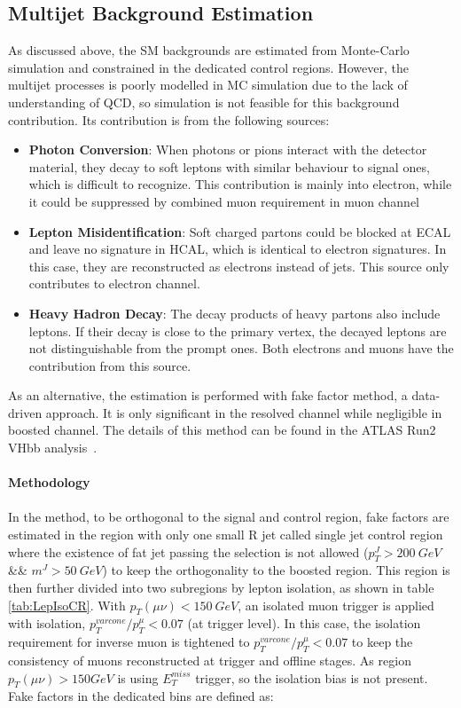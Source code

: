 \subsection{Multijet Background Estimation}
\label{sec:multijet_background}
As discussed above, the SM backgrounds are estimated from Monte-Carlo simulation and constrained in the dedicated control regions. However, the multijet processes is poorly modelled in MC simulation due to the lack of understanding of QCD, so simulation is not feasible for this background contribution. Its contribution is from the following sources:
\begin{itemize}
	\item {\bf Photon Conversion}: When photons or pions interact with the detector material, they decay to soft leptons with similar behaviour to signal ones, which is difficult to recognize. This contribution is mainly into electron, while it could be suppressed by combined muon requirement in muon channel
	\item {\bf Lepton Misidentification}: Soft charged partons could be blocked at ECAL and leave no signature in HCAL, which is identical to electron signatures. In this case, they are reconstructed as electrons instead of jets. This source only contributes to electron channel.
	\item {\bf Heavy Hadron Decay}: The decay products of heavy partons also include leptons. If their decay is close to the primary vertex, the decayed leptons are not distinguishable from the prompt ones. Both electrons and muons have the contribution from this source. 
\end{itemize}
\noindent
As an alternative, the estimation is performed with fake factor method, a data-driven approach. It is only significant in the resolved channel while negligible in boosted channel.  The details of this method can be found in the ATLAS Run2 VHbb analysis~\cite{ATLAS-CONF-2016-091, ATL-COM-PHYS-2016-429}. 
\\
\\{\bf Methodology}
\\
\\In the method, to be orthogonal to the signal and control region, fake factors are estimated in the region with only one small R jet called single jet control region where the existence of fat jet passing the selection is not allowed ($p_{T}^{J}>200~GeV$ \&\& $m^{J}>50~GeV$) to keep the orthogonality to the boosted region. This region is then further divided into two subregions by lepton isolation, as shown in table \ref{tab:LepIsoCR}. With $p_{T}(\mu\nu)<150~GeV$, an isolated muon trigger is applied with isolation, $p_{T}^{varcone}/p^{\mu}_{T}<0.07$ (at trigger level). In this case, the isolation requirement for inverse muon is tightened to $p_{T}^{varcone}/p^{\mu}_{T}<0.07$ to keep the consistency of muons reconstructed at trigger and offline stages. As region $p_{T}(\mu\nu)>150 GeV$ is using $E_{T}^{miss}$ trigger, so the isolation bias is not present. Fake factors in the dedicated bins are defined as:
